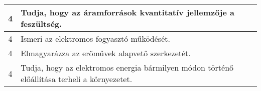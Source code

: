 \begin{longtable}{c | p{} }
                                          4 &  Tudja, hogy az áramforrások kvantitatív jellemzője a feszültség. \\ \hline
                                          4 &  Ismeri az elektromos fogyasztó működését. \\ \hline
                                          4 &  Elmagyarázza az erőművek alapvető szerkezetét. \\ \hline
                                          4 &  Tudja, hogy az elektromos energia bármilyen módon történő előállítása terheli a környezetet. \\ \hline
                                      
                        \end{longtable}
            \clearpage

       
